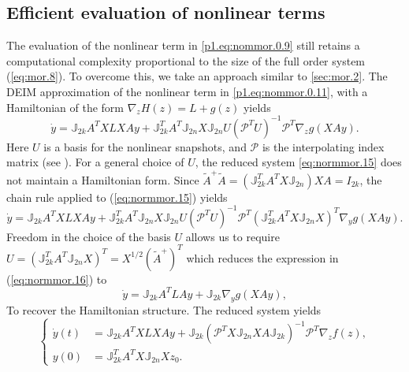 \subsection{Efficient evaluation of nonlinear terms} \label{sec:normmor.3}
The evaluation of the nonlinear term in \eqref{p1.eq:nommor.0.9} still retains a computational complexity proportional to the size of the full order system (\ref{eq:mor.8}). To overcome this, we take an approach similar to \cref{sec:mor.2}. The DEIM approximation of the nonlinear term in \eqref{p1.eq:nommor.0.11}, with a Hamiltonian of the form $\nabla_z H(z) = L + g(z)$ yields
\begin{equation} \label{eq:normmor.15}
	\dot y = \mathbb J_{2k} A^TXLXAy + \mathbb J_{2k}^T A^T \mathbb J_{2n} X \mathbb J_{2n} U (\mathcal P^TU)^{-1} \mathcal P^T \nabla_z g(XAy).
\end{equation}
Here $U$ is a basis for the nonlinear snapshots, and $\mathcal P$ is the interpolating index matrix (see ). For a general choice of $U$, the reduced system \eqref{eq:normmor.15} does not maintain a Hamiltonian form. Since $ \tilde A^+ \tilde A = ( \mathbb J_{2k}^T A^T X \mathbb J_{2n}) X A = I_{2k}$, the chain rule applied to (\ref{eq:normmor.15}) yields
\begin{equation} \label{eq:normmor.16}
	\dot y = \mathbb J_{2k} A^TXLXAy + \mathbb J_{2k}^T A^T \mathbb J_{2n} X \mathbb J_{2n} U (\mathcal P^TU)^{-1} \mathcal P^T (\mathbb J_{2k}^T A^T X \mathbb J_{2n} X)^T \nabla_y g(XAy).
\end{equation}
Freedom in the choice of the basis $U$ allows us to require $U = (\mathbb J_{2k}^T A^T \mathbb J_{2n} X)^T = X^{1/2} (\tilde A^+)^T$ which reduces the expression in (\ref{eq:normmor.16}) to
\begin{equation} \label{eq:normmor.17}
	\dot y = \mathbb J_{2k} A^TLAy + \mathbb J_{2k} \nabla_y g(XAy),
\end{equation}
To recover the Hamiltonian structure. The reduced system yields
\begin{equation} \label{eq:normmor.18}
\left\{
\begin{aligned}
	\dot y(t) &= \mathbb J_{2k} A^TXLXAy + \mathbb J_{2k} ( \mathcal P^TX \mathbb J_{2n} X A \mathbb J_{2k})^{-1} \mathcal P^T \nabla_z f(z), \\
	y(0) &= \mathbb J_{2k}^T A^T X \mathbb J_{2n} X z_0.
\end{aligned}
\right.
\end{equation}
